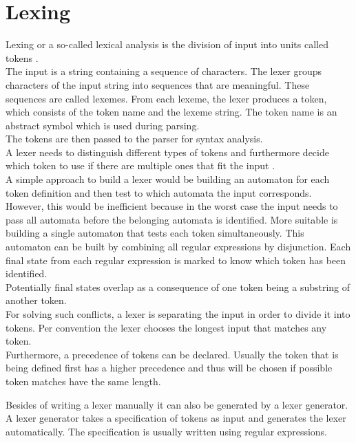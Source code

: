 \section{Lexing}\label{sec:BackgroundLexer}

Lexing or a so-called lexical analysis is the division of input into units called tokens \cite{LexYacc.1992}.\\
The input is a string containing a sequence of characters.
The lexer groups characters of the input string into sequences that are meaningful. These sequences are called lexemes. From each lexeme, the lexer produces a token, which consists of the token name and the lexeme string. The token name is an abstract symbol which is used during parsing. \cite{Aho.2007} \\
The tokens are then passed to the parser for syntax analysis.\\
A lexer needs to distinguish different types of tokens and furthermore decide which token to use if there are multiple ones that fit the input \cite{Mogensen.2017}.\\
A simple approach to build a lexer would be building an automaton for each token definition and then test to which automata the input corresponds.\\
However, this would be inefficient because in the worst case the input needs to pass all automata before the belonging automata is identified.
More suitable is building a single automaton that tests each token simultaneously.
This automaton can be built by combining all regular expressions by disjunction.
Each final state from each regular expression is marked to know which token has been identified.\\
Potentially final states overlap as a consequence of one token being a substring of another token. \\
For solving such conflicts, a lexer is separating the input in order to divide it into tokens.
Per convention the lexer chooses the longest input that matches any token. \cite{Mogensen.2017} \\
Furthermore, a precedence of tokens can be declared. Usually the token that is being defined first has a higher precedence and thus will be chosen if possible token matches have the same length. \cite{Mogensen.2017}

Besides of writing a lexer manually it can also be generated by a lexer generator. A lexer generator takes a specification of tokens as input and generates the lexer automatically. 
The specification is usually written using regular expressions. 

